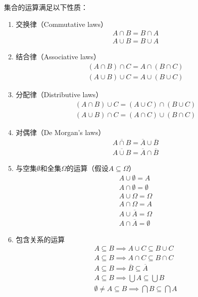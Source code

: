 \begin{property}
集合的运算满足以下性质：
\begin{enumerate}
\item 交换律（Commutative laws）
\begin{gather}
A \cap B = B \cap A \\
A \cup B = B \cup A
\end{gather}

\item 结合律（Associative laws）
\begin{gather}
(A \cap B) \cap C = A \cap (B \cap C) \\
(A \cup B) \cup C = A \cup (B \cup C)
\end{gather}

\item 分配律（Distributive laws）
\begin{gather}
(A \cap B) \cup C = (A \cup C) \cap (B \cup C) \\
(A \cup B) \cap C = (A \cap C) \cup (B \cap C)
\end{gather}

\item 对偶律（De Morgan's laws）
\begin{gather}
\overline{A \cap B} = \overline A \cup \overline B \\
\overline{A \cup B} = \overline A \cap \overline B
\end{gather}

\item 与空集\(\emptyset\)和全集\(\Omega\)的运算（假设\(A \subseteq \Omega\)）
\begin{gather}
A \cup \emptyset = A \\
A \cap \emptyset = \emptyset \\
A \cup \Omega = \Omega \\
A \cap \Omega = A \\
A \cup \overline{A} = \Omega \\
A \cap \overline{A} = \emptyset
\end{gather}

\item 包含关系的运算
\begin{gather}
A \subseteq B \implies A \cup C \subseteq B \cup C \\
A \subseteq B \implies A \cap C \subseteq B \cap C \\
A \subseteq B \implies \overline{B} \subseteq \overline{A} \\
A \subseteq B \implies \bigcup A \subseteq \bigcup B \\
\emptyset \neq A \subseteq B \implies \bigcap B \subseteq \bigcap A
\end{gather}
\end{enumerate}
\end{property}

